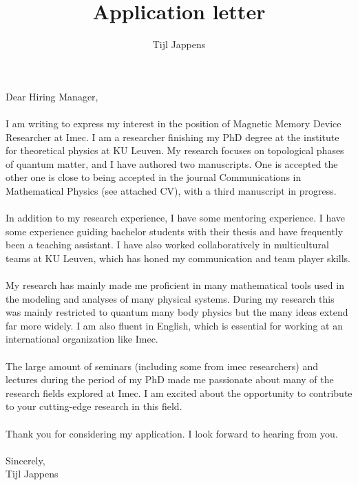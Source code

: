 \documentclass[11pt]{article}
\title{Application letter}
\author{Tijl Jappens}
\begin{document}
\maketitle
Dear Hiring Manager,\\\\
I am writing to express my interest in the position of Magnetic Memory Device Researcher at Imec. I am a researcher finishing my PhD degree at the institute for theoretical physics at KU Leuven. My research focuses on topological phases of quantum matter, and I have authored two manuscripts. One is accepted the other one is close to being accepted in the journal Communications in Mathematical Physics (see attached CV), with a third manuscript in progress.\\\\
In addition to my research experience, I have some mentoring experience. I have some experience guiding bachelor students with their thesis and have frequently been a teaching assistant. I have also worked collaboratively in multicultural teams at KU Leuven, which has honed my communication and team player skills.\\\\
My research has mainly made me proficient in many mathematical tools used in the modeling and analyses of many physical systems. During my research this was mainly restricted to quantum many body physics but the many ideas extend far more widely. I am also fluent in English, which is essential for working at an international organization like Imec.\\\\
The large amount of seminars (including some from imec researchers) and lectures during the period of my PhD made me passionate about many of the research fields explored at Imec. I am excited about the opportunity to contribute to your cutting-edge research in this field.\\\\
Thank you for considering my application. I look forward to hearing from you.\\\\
Sincerely,\\
Tijl Jappens
\end{document}
